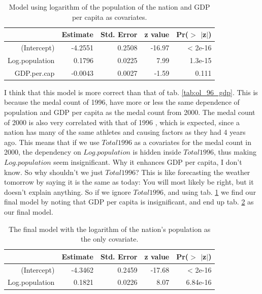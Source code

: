\documentclass[a4paper,norsk, 10pt]{article}
\begin{document}
\begin{table}[!htb]
\centering
\begin{tabular}{rrrrr}
  \hline
 & Estimate & Std. Error & z value & Pr($>$ $|$z$|$) \\ 
  \hline
(Intercept) & -4.2551 & 0.2508 & -16.97 & < 2e-16 \\ 
  Log.population & 0.1796 & 0.0225 & 7.99 & 1.3e-15 \\ 
  GDP.per.cap & -0.0043 & 0.0027 & -1.59 & 0.111 \\ 
   \hline
\end{tabular}
\caption{Model using logarithm of the population of the nation and GDP per capita as covariates.}\label{tab:ol_pop_gdp}
\end{table}

I think that this model is more correct than that of tab. \ref{tab:ol_96_gdp}. This is because the medal count of 1996, have more or less the same dependence of population and GDP per capita as the medal count from 2000.  The medal count of 2000 is also very correlated with that of 1996 , which is expected, since a nation has many of the same athletes and causing factors as they had 4 years ago. This means that if we use $Total1996$ as a covariates for the medal count in 2000, the dependency on $Log.population$ is hidden inside $Total1996$, thus making $Log.population$ seem insignificant. Why it enhances GDP per capita, I don't know. So why shouldn't we just $Total1996$? This is like forecasting the weather tomorrow by saying it is the same as today: You will most likely be right, but it doesn't explain anything. So if we ignore $Total1996$, and using tab. \ref{tab:ol_pop_gdp} we find our final model by noting that GDP per capita is insignificant, and end up tab. \ref{tab:ol_pop} as our final model.


\begin{table}[!htb]
\centering
\begin{tabular}{rrrrr}
  \hline
 & Estimate & Std. Error & z value & Pr($>$ $|$z$|$) \\ 
  \hline
(Intercept) & -4.3462 & 0.2459 & -17.68 & < 2e-16 \\ 
  Log.population & 0.1821 & 0.0226 & 8.07 & 6.84e-16 \\ 
   \hline
\end{tabular}
\caption{The final model with the logarithm of the nation's population as the only covariate.}\label{tab:ol_pop}
\end{table}
\end{document}
